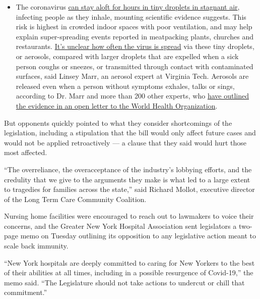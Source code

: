 \begin{itemize}
  \begin{itemize}
  \tightlist
  \item
    The coronavirus
    \href{https://www.nytimes.com/2020/07/04/health/239-experts-with-one-big-claim-the-coronavirus-is-airborne.html?action=click\&pgtype=Article\&state=default\&region=MAIN_CONTENT_3\&context=storylines_faq}{can
    stay aloft for hours in tiny droplets in stagnant air}, infecting
    people as they inhale, mounting scientific evidence suggests. This
    risk is highest in crowded indoor spaces with poor ventilation, and
    may help explain super-spreading events reported in meatpacking
    plants, churches and restaurants.
    \href{https://www.nytimes.com/2020/07/06/health/coronavirus-airborne-aerosols.html?action=click\&pgtype=Article\&state=default\&region=MAIN_CONTENT_3\&context=storylines_faq}{It's
    unclear how often the virus is spread} via these tiny droplets, or
    aerosols, compared with larger droplets that are expelled when a
    sick person coughs or sneezes, or transmitted through contact with
    contaminated surfaces, said Linsey Marr, an aerosol expert at
    Virginia Tech. Aerosols are released even when a person without
    symptoms exhales, talks or sings, according to Dr. Marr and more
    than 200 other experts, who
    \href{https://academic.oup.com/cid/article/doi/10.1093/cid/ciaa939/5867798}{have
    outlined the evidence in an open letter to the World Health
    Organization}.
  \end{itemize}
\end{itemize}

But opponents quickly pointed to what they consider shortcomings of the
legislation, including a stipulation that the bill would only affect
future cases and would not be applied retroactively --- a clause that
they said would hurt those most affected.

``The overreliance, the overacceptance of the industry's lobbying
efforts, and the credulity that we give to the arguments they make is
what led to a large extent to tragedies for families across the state,''
said Richard Mollot, executive director of the Long Term Care Community
Coalition.

Nursing home facilities were encouraged to reach out to lawmakers to
voice their concerns, and the Greater New York Hospital Association sent
legislators a two-page memo on Tuesday outlining its opposition to any
legislative action meant to scale back immunity.

``New York hospitals are deeply committed to caring for New Yorkers to
the best of their abilities at all times, including in a possible
resurgence of Covid-19,'' the memo said. ``The Legislature should not
take actions to undercut or chill that commitment.''

